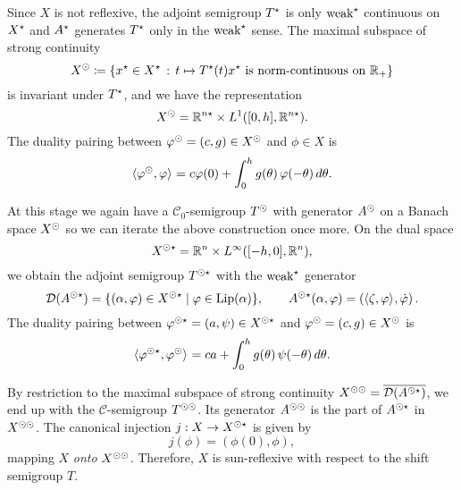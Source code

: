 Since $X$ is not reflexive, the adjoint semigroup $T^{\star}$ is 
only $\text{weak}^{\star}$ continuous on $X^{\star}$ and $A^{\star}$ generates $T^{\star}$
only in the $\text{weak}^{\star}$ sense. The maximal subspace of strong continuity
\[
X^{\odot} \coloneqq \left\{x^{\star} \in X^{\star} \,:\, 
    t \mapsto T^{\star}(t)x^{\star} \text{ is norm-continuous on } \mathbb{R}_+\right\}
\]
is invariant under $T^{\star}$, and we have the representation
\begin{equation}
  \label{btdde:eq:xsun_dde}
  X^{\odot} = \mathbb{R}^{n\star} \times L^1([0,h],\mathbb{R}^{n\star}).
\end{equation}
%
The duality pairing between $\varphi^{\odot} = (c,g) \in X^{\odot}$ and $\phi \in X$ is
\begin{equation}
  \label{btdde:eq:pairing_X_sun_X}
  \langle \varphi^{\odot},\varphi \rangle_{} = c\varphi(0)+ \int_{0}^{h}g(\theta)\,\varphi(-\theta)\,d\theta.
\end{equation}

At this stage we again have a $\mathcal{C}_0$-semigroup $T^{\odot}$ with
generator $A^{\odot}$ on a Banach space $X^{\odot}$ so we can iterate the above
construction once more. On the dual space 
  \[
    X^{\odot\star} = \mathbb{R}^n \times L^\infty([-h,0], \mathbb{R}^n),
  \]
we obtain the adjoint semigroup $T^{\odot\star}$ with the $\text{weak}^{\star}$ generator  
\begin{equation}
    \label{btdde:eq:A_sunstar}
    \mathcal{D}{(A^{\odot\star})}  = \{ (\alpha,\varphi) \in X^{\odot\star} \mid \varphi \in \operatorname{Lip}(\alpha) \}, 
    \qquad 
    A^{\odot\star}(\alpha,\varphi) = \left( \langle \zeta,\varphi \rangle_{}, \dot {\varphi} \right).
\end{equation}
The duality pairing between $\varphi^{\odot\star} = (a,\psi) \in X^{\odot\star}$ and
$\varphi^{\odot} = (c,g) \in X^{\odot}$ is
\begin{equation}
  \label{btdde:eq:pairing_X_sun_star_X_sun}
  \langle \varphi^{\odot\star},\varphi^{\odot} \rangle_{} = 
    ca + \int_{0}^{h}g(\theta)\,\psi(-\theta)\,d\theta.
\end{equation}

By restriction to the maximal subspace of strong continuity $X^{\odot\odot} =
\overline{\mathcal{D}(A^{\odot\star})}$, we end up with the $\mathcal{C}$-semigroup
$T^{\odot\odot}$. Its generator $A^{\odot\odot}$ is the part of $A^{\odot\star}$ in
$X^{\odot\odot}$.
The canonical injection $j : X \to X^{\odot\star}$ is given by
\begin{equation}
    \label{btdde:eq:j}
    j(\phi) = \left(\phi(0), \phi \right),
\end{equation}
mapping $X$ \emph{onto} $X^{\odot\odot}$. Therefore, $X$ is sun-reflexive with
respect to the shift semigroup $T$.

